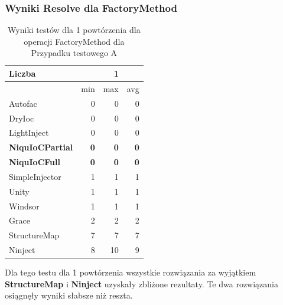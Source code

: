\documentclass[12pt]{article}
\begin{document}
\subsubsection{Wyniki Resolve dla FactoryMethod}
\begin{table}[H]
\captionsetup{belowskip=0pt,aboveskip=0pt}
\begin{center}
\begin{small}
	\begin{tabular}{ | l | r r r | }
    		\hline
Liczba & & 1 & \\ \hline
 & min & max & avg \\ \hline
Autofac & 0 & 0 & 0 \\ \hline
DryIoc & 0 & 0 & 0 \\ \hline
LightInject & 0 & 0 & 0 \\ \hline
\textbf{NiquIoCPartial} & \textbf{0} & \textbf{0} & \textbf{0} \\ \hline
\textbf{NiquIoCFull} & \textbf{0} & \textbf{0} & \textbf{0} \\ \hline
SimpleInjector & 1 & 1 & 1 \\ \hline
Unity & 1 & 1 & 1 \\ \hline
Windsor & 1 & 1 & 1 \\ \hline
Grace & 2 & 2 & 2 \\ \hline
StructureMap & 7 & 7 & 7 \\ \hline
Ninject & 8 & 10 & 9 \\ \hline
  	\end{tabular}
\end{small}
\end{center}
\caption{Wyniki testów dla 1 powtórzenia dla operacji FactoryMethod dla Przypadku testowego A}
\label{TestCaseA_FactoryMethod1}
\end{table}
Dla tego testu dla 1 powtórzenia wszystkie rozwiązania za wyjątkiem \textbf{StructureMap} i \textbf{Ninject} uzyskały zbliżone rezultaty. Te dwa rozwiązania osiągnęły wyniki słabsze niż reszta.
\end{document}
